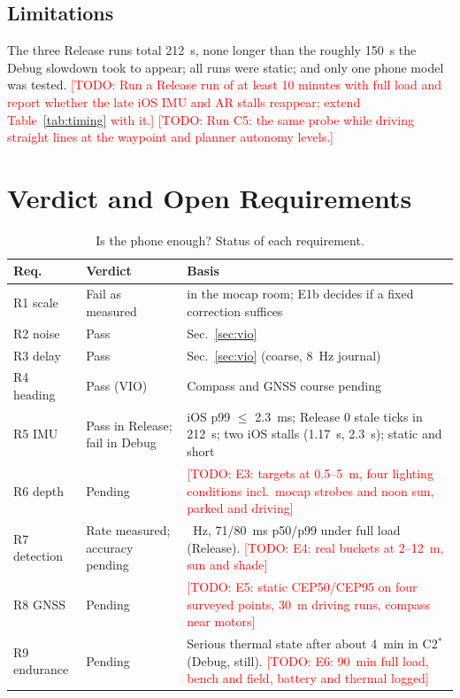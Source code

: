 \documentclass[conference]{IEEEtran}
\newcommand{\todo}[1]{\textcolor{red}{[TODO: #1]}}
\begin{document}
\subsection{Limitations}
The three Release runs total 212~s, none longer than the roughly 150~s the Debug slowdown took to appear; all runs were static; and only one phone model was tested.
\todo{Run a Release run of at least 10 minutes with full load and report whether the late iOS IMU and AR stalls reappear; extend Table~\ref{tab:timing} with it.}
\todo{Run C5: the same probe while driving straight lines at the waypoint and planner autonomy levels.}

\section{Verdict and Open Requirements}
\label{sec:verdict}

\begin{table}[t]
\centering
\caption{Is the phone enough? Status of each requirement.}
\label{tab:verdict}
\footnotesize
\setlength{\tabcolsep}{3pt}
\begin{tabularx}{\columnwidth}{@{}l >{\raggedright\arraybackslash}p{1.55cm} >{\raggedright\arraybackslash}X@{}}
\toprule
Req. & Verdict & Basis \\
\midrule
R1 scale & Fail as measured & 0.91 in the mocap room; E1b decides if a fixed correction suffices \\
R2 noise & Pass & Sec.~\ref{sec:vio} \\
R3 delay & Pass & Sec.~\ref{sec:vio} (coarse, 8~Hz journal) \\
R4 heading & Pass (VIO) & Compass and GNSS course pending \\
R5 IMU & Pass in Release; fail in Debug & iOS p99 $\le$ 2.3~ms; Release 0 stale ticks in 212~s; two iOS stalls (1.17~s, 2.3~s); static and short \\
R6 depth & Pending & \todo{E3: targets at 0.5--5~m, four lighting conditions incl.\ mocap strobes and noon sun, parked and driving} \\
R7 detection & Rate measured; accuracy pending & 4.3~Hz, 71/80~ms p50/p99 under full load (Release). \todo{E4: real buckets at 2--12~m, sun and shade} \\
R8 GNSS & Pending & \todo{E5: static CEP50/CEP95 on four surveyed points, 30~m driving runs, compass near motors} \\
R9 endurance & Pending & Serious thermal state after about 4~min in C2$^{*}$ (Debug, still). \todo{E6: 90~min full load, bench and field, battery and thermal logged} \\
\bottomrule
\end{tabularx}
\end{table}
\end{document}
